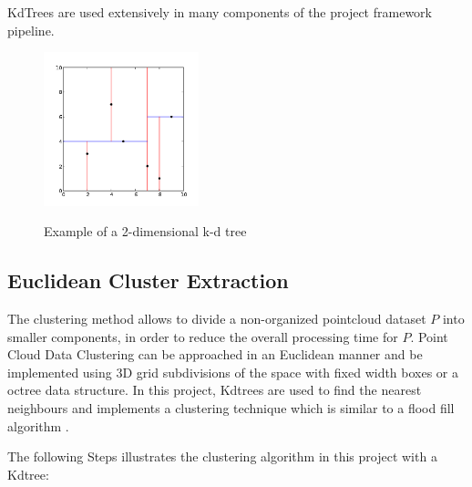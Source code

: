 \documentclass[12pt]{report}
\begin{document}
KdTrees are used extensively in many components of the project framework pipeline.
\begin{figure}[H]%
  \centering
  \includegraphics[width=0.4\textwidth]{2d_kdtree.png}
 \caption{Example of a 2-dimensional k-d tree}\cite[]{Rusu_ICRA2011_PCL}
 \label{fig:kdtree} 
\end{figure}

\subsection{Euclidean Cluster Extraction}
\label{section:Euclidean Cluster Extraction}

The clustering method allows to divide a non-organized pointcloud dataset \textbf{$P$} into smaller components, in order to reduce the overall processing time for \textbf{$P$}.
Point Cloud Data Clustering can be approached in an Euclidean manner and be implemented using 3D grid subdivisions of the space with fixed width boxes or a octree data structure.
In this project, Kdtrees are used to find the nearest neighbours and implements a clustering technique which is similar to a flood fill algorithm .

The following Steps illustrates the clustering algorithm in this project with a Kdtree:
\end{document}
